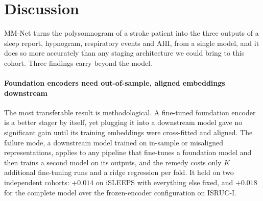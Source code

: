 \documentclass{ieeeaccess}
\begin{document}
\begin{table}[t]
\caption{MM-Net trained on all $99$ iSLEEPS patients and applied unchanged (three-seed).
Seven-channel variant without nasal pressure; AHI scale $k$ from iSLEEPS. AHI is not
reported for the healthy ISRUC-III subjects.}
\label{tab:transfer}
\centering
\small
\setlength{\tabcolsep}{3pt}
\end{table}

\section{Discussion}
\label{sec:discussion}
MM-Net turns the polysomnogram of a stroke patient into the three outputs of a sleep report,
hypnogram, respiratory events and AHI, from a single model, and it does so more accurately than
any staging architecture we could bring to this cohort. Three findings carry beyond the
model.

\paragraph{Foundation encoders need out-of-sample, aligned embeddings downstream} The most
transferable result is methodological. A fine-tuned foundation encoder is a better stager by
itself, yet plugging it into a downstream model gave no significant gain until its training
embeddings were cross-fitted and aligned. The failure mode, a downstream model trained on
in-sample or misaligned representations, applies to any pipeline that fine-tunes a foundation
model and then trains a second model on its outputs, and the remedy costs only $K$ additional
fine-tuning runs and a ridge regression per fold. It held on two independent cohorts:
$+0.014$ on iSLEEPS with everything else fixed, and $+0.018$ for the complete model over the
frozen-encoder configuration on ISRUC-I.
\end{document}
